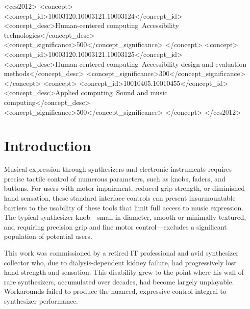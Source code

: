 \documentclass[manuscript,screen,review,anonymous]{acmart}
\begin{document}
\begin{CCSXML}
<ccs2012>
<concept>
<concept_id>10003120.10003121.10003124</concept_id>
<concept_desc>Human-centered computing~Accessibility technologies</concept_desc>
<concept_significance>500</concept_significance>
</concept>
<concept>
<concept_id>10003120.10003121.10003125</concept_id>
<concept_desc>Human-centered computing~Accessibility design and evaluation methods</concept_desc>
<concept_significance>300</concept_significance>
</concept>
<concept>
<concept_id>10010405.10010455</concept_id>
<concept_desc>Applied computing~Sound and music computing</concept_desc>
<concept_significance>500</concept_significance>
</concept>
</ccs2012>
\end{CCSXML}



\maketitle

\section{Introduction}

Musical expression through synthesizers and electronic instruments requires precise tactile control of numerous parameters, such as knobs, faders, and buttons. For users with motor impairment, reduced grip strength, or diminished hand sensation, these standard interface controls can present insurmountable barriers to the usability of these tools that limit full access to music expression. The typical synthesizer knob—small in diameter, smooth or minimally textured, and requiring precision grip and fine motor control—excludes a significant population of potential users. \cite{vamvakousis2016dmi}

This work was commissioned by a retired IT professional and avid synthesizer collector who, due to dialysis-dependent kidney failure, had progressively lost hand strength and sensation. This disability grew to the point where his wall of rare synthesizers, accumulated over decades, had become largely unplayable. Workarounds failed to produce the nuanced, expressive control integral to synthesizer performance.
\end{document}
